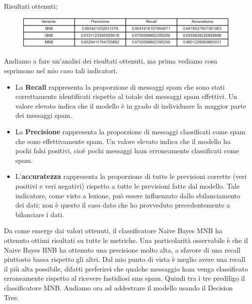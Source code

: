 \documentclass[]{article}
\begin{document}
                    Risultati ottenuti:
                    \begin{figure}[H]
                        \centering
                        \includegraphics[width=1\linewidth]{images/resultTableNaiveBayes.png}
                        \label{fig:enter-label}
                    \end{figure}
                    Andiamo a fare un'analisi dei risultati ottenuti, ma prima vediamo cosa esprimono nel mio caso tali indicatori.
                    \begin{itemize}
                        \item La \textbf{Recall} rappresenta la proporzione di messaggi spam che sono stati correttamente identificati rispetto al totale dei messaggi spam effettivi. Un valore elevato indica che il modello è in grado di individuare la maggior parte dei messaggi spam.
                        \item La \textbf{Precisione} rappresenta la proporzione di messaggi classificati come spam che sono effettivamente spam. Un valore elevato indica che il modello ha pochi falsi positivi, cioè pochi messaggi ham erroneamente classificati come spam.
                        \item L'\textbf{accuratezza} rappresenta la proporzione di tutte le previsioni corrette (veri positivi e veri negativi) rispetto a tutte le previsioni fatte dal modello. Tale indicatore, come visto a lezione, può essere influenzato dallo sbilanciamento dei dati; non è questo il caso dato che ho provveduto precedentemente a bilanciare i dati.
                    \end{itemize}
                    Da come emerge dai valori ottenuti, il classificatore Naive Bayes MNB ha ottenuto ottimi risultati su tutte le metriche. Una particolarità osservabile è che il Naive Bayes BNB ha ottenuto una precisione molto alta, a sfavore di una recall piuttosto bassa rispetto gli altri. Dal mio punto di vista è meglio avere una recall il più alta possibile, difatti preferirei che qualche messaggio ham venga classificato erroneamente rispetto al ricevere fastidiosi sms spam. Quindi tra i tre prediligo il classificatore MNB.
                    Andiamo ora ad addestrare il modello usando il Decision Tree.
\end{document}
